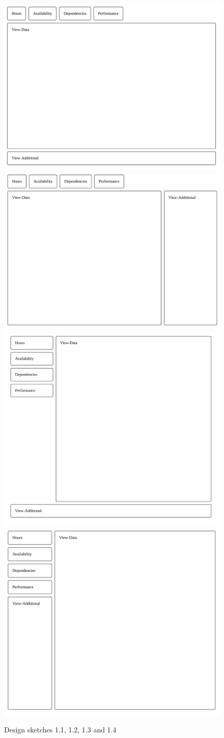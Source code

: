 {	\begin{figure}[h!]
		\center
		\includegraphics[valign=t,trim={.15cm .10cm .35cm .22cm},clip,width=.49\linewidth]{ui11.pdf}
		\includegraphics[valign=t,trim={.15cm .30cm .20cm .22cm},clip,width=.49\linewidth]{ui12.pdf}
		\includegraphics[valign=t,trim={.45cm .55cm .65cm .35cm},clip,width=.49\linewidth]{ui13.pdf}
		\includegraphics[valign=t,trim={.25cm .35cm .30cm .25cm},clip,width=.49\linewidth]{ui14.pdf}
		\caption{Design sketches 1.1, 1.2, 1.3 and 1.4}
		\label{label_mockupInterfaces}
	\end{figure}

}

